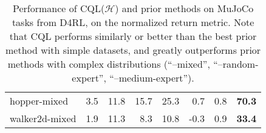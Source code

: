 \begin{table*}[h]
\begin{tabular}{l|r|r|r|r|r|r||r}
hopper-mixed & 3.5 & 11.8 & 15.7 & 25.3 & 0.7 & 0.8 & \textbf{70.3}\\
walker2d-mixed & 1.9 & 11.3 & 8.3 & 10.8 & -0.3 & 0.9 & \textbf{33.4}\\
\hline
\end{tabular}
\caption{\label{table:mujoco}{\small Performance of CQL($\mathcal{H}$) and prior methods on MuJoCo tasks from D4RL, on the normalized return metric. Note that CQL performs similarly or better than the best prior method with simple datasets, and greatly outperforms prior methods with complex distributions (``--mixed'', ``--random-expert'', ``--medium-expert'').}}
\normalsize
\vspace{-10pt}
\end{table*}


